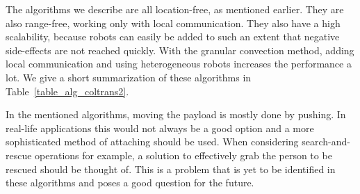 The algorithms we describe are all location-free, as mentioned earlier. 
They are also range-free, working only with local communication.
They also have a high scalability, because robots can easily be added to such an extent that negative side-effects are not reached quickly.
With the granular convection method, adding local communication and using heterogeneous robots increases the performance a lot. 
We give a short summarization of these algorithms in Table~\ref{table_alg_coltrans2}.

  \begin{table}[H]
  \renewcommand{\arraystretch}{1.3}
  \label{table_alg_coltrans2}
  \centering
{}
    \caption{Overview of Collective Transport Algorithms}
  \end{table}



In the mentioned algorithms, moving the payload is mostly done by pushing. 
In real-life applications this would not always be a good option and a more sophisticated method of attaching should be used. 
When considering search-and-rescue operations for example, a solution to effectively grab the person to be rescued should be thought of. 
This is a problem that is yet to be identified in these algorithms and poses a good question for the future.
